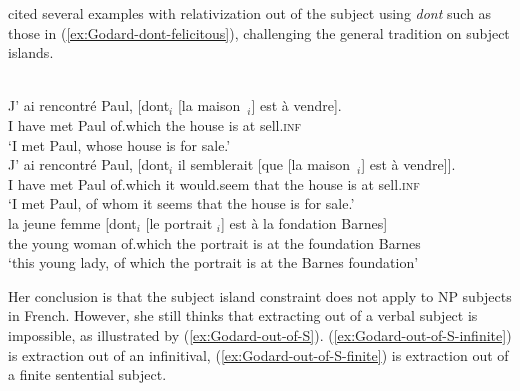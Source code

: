 \eal
\zl

\citet{Godard.1988} cited several examples with relativization out of the subject using \emph{dont} such as those in (\ref{ex:Godard-dont-felicitous}), challenging the general tradition on subject islands. 

\eal \label{ex:Godard-dont-felicitous}
\ex \citep[109]{Godard.1988}\\
\gll J' ai rencontré Paul, [dont$_i$ [la maison~\trace{}$_i$] est à vendre].\\
I have met Paul \sbar{}of.which \sbar{}the house is at sell\textsc{.inf}\\
\glt `I met Paul, whose house is for sale.'
\ex \citep[109]{Godard.1988}\\
\gll J' ai rencontré Paul, [dont$_i$ il semblerait [que [la maison~\trace{}$_i$] est à vendre]].\\
I have met Paul \sbar{}of.which it would.seem \sbar{}that \sbar{}the house is at sell\textsc{.inf}\\
\glt `I met Paul, of whom it seems that the house is for sale.'
\ex \citep[63]{Godard.1996}\\
\gll la jeune femme [dont$_i$ [le portrait \trace{}$_i$] est à la fondation Barnes] \\
the young woman \sbar{}of.which \sbar{}the portrait {} is at the foundation Barnes \\
\glt `this young lady, of which the portrait is at the Barnes foundation'
\label{ex:GS-french} 
\zl 

Her conclusion is that the subject island constraint does not apply to NP subjects in French. However, she still thinks that extracting out of a verbal subject is impossible, as illustrated by (\ref{ex:Godard-out-of-S}). (\ref{ex:Godard-out-of-S-infinite}) is extraction out of an infinitival, (\ref{ex:Godard-out-of-S-finite}) is extraction out of a finite sentential subject.

